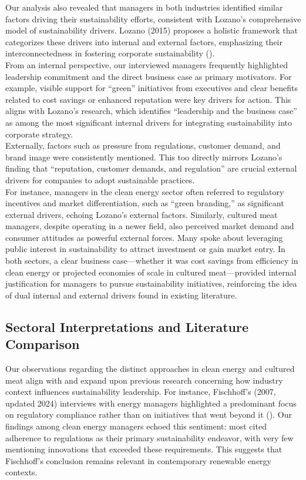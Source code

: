 	Our analysis also revealed that managers in both industries identified similar factors driving their sustainability efforts, consistent with Lozano’s comprehensive model of sustainability drivers. Lozano (2015) proposes a holistic framework that categorizes these drivers into internal and external factors, emphasizing their interconnectedness in fostering corporate sustainability (\textcite{Lozano2015}). \\
	
	From an internal perspective, our interviewed managers frequently highlighted leadership commitment and the direct business case as primary motivators. For example, visible support for ``green'' initiatives from executives and clear benefits related to cost savings or enhanced reputation were key drivers for action. This aligns with Lozano’s research, which identifies ``leadership and the business case'' as among the most significant internal drivers for integrating sustainability into corporate strategy. \\
	
	Externally, factors such as pressure from regulations, customer demand, and brand image were consistently mentioned. This too directly mirrors Lozano’s finding that ``reputation, customer demands, and regulation'' are crucial external drivers for companies to adopt sustainable practices. \\
	
	For instance, managers in the clean energy sector often referred to regulatory incentives and market differentiation, such as ``green branding,'' as significant external drivers, echoing Lozano’s external factors. Similarly, cultured meat managers, despite operating in a newer field, also perceived market demand and consumer attitudes as powerful external forces. Many spoke about leveraging public interest in sustainability to attract investment or gain market entry. In both sectors, a clear business case—whether it was cost savings from efficiency in clean energy or projected economies of scale in cultured meat—provided internal justification for managers to pursue sustainability initiatives, reinforcing the idea of dual internal and external drivers found in existing literature. \\
	
	\subsection{Sectoral Interpretations and Literature Comparison}
	Our observations regarding the distinct approaches in clean energy and cultured meat align with and expand upon previous research concerning how industry context influences sustainability leadership. For instance, Fischhoff’s (2007, updated 2024) interviews with energy managers highlighted a predominant focus on regulatory compliance rather than on initiatives that went beyond it (\textcite{Fischhoff2024}). Our findings among clean energy managers echoed this sentiment: most cited adherence to regulations as their primary sustainability endeavor, with very few mentioning innovations that exceeded these requirements. This suggests that Fischhoff’s conclusion remains relevant in contemporary renewable energy contexts. \\
	
